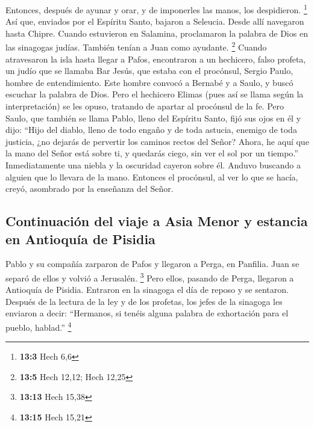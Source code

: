 \begin{paracol}{2}
 Entonces, después de ayunar y orar, y de imponerles las
manos, los despidieron. \footnote{\textbf{13:3} Hech 6,6} 
Así que, enviados por el Espíritu Santo, bajaron a Seleucia. Desde allí
navegaron hasta Chipre.  Cuando estuvieron en Salamina,
proclamaron la palabra de Dios en las sinagogas judías. También tenían a
Juan como ayudante. \footnote{\textbf{13:5} Hech 12,12; Hech 12,25}
 Cuando atravesaron la isla hasta llegar a Pafos,
encontraron a un hechicero, falso profeta, un judío que se llamaba Bar
Jesús,  que estaba con el procónsul, Sergio Paulo, hombre
de entendimiento. Este hombre convocó a Bernabé y a Saulo, y buscó
escuchar la palabra de Dios.  Pero el hechicero Elimas
(pues así se llama según la interpretación) se les opuso, tratando de
apartar al procónsul de la fe.  Pero Saulo, que también se
llama Pablo, lleno del Espíritu Santo, fijó sus ojos en él
 y dijo: ``Hijo del diablo, lleno de todo engaño y de
toda astucia, enemigo de toda justicia, ¿no dejarás de pervertir los
caminos rectos del Señor?  Ahora, he aquí que la mano del
Señor está sobre ti, y quedarás ciego, sin ver el sol por un tiempo.''
Inmediatamente una niebla y la oscuridad cayeron sobre él. Anduvo
buscando a alguien que lo llevara de la mano.  Entonces
el procónsul, al ver lo que se hacía, creyó, asombrado por la enseñanza
del Señor.

\hypertarget{continuaciuxf3n-del-viaje-a-asia-menor-y-estancia-en-antioquuxeda-de-pisidia}{%
\subsection{Continuación del viaje a Asia Menor y estancia en Antioquía
de
Pisidia}\label{continuaciuxf3n-del-viaje-a-asia-menor-y-estancia-en-antioquuxeda-de-pisidia}}

 Pablo y su compañía zarparon de Pafos y llegaron a
Perga, en Panfilia. Juan se separó de ellos y volvió a Jerusalén.
\footnote{\textbf{13:13} Hech 15,38}  Pero ellos, pasando
de Perga, llegaron a Antioquía de Pisidia. Entraron en la sinagoga el
día de reposo y se sentaron.  Después de la lectura de la
ley y de los profetas, los jefes de la sinagoga les enviaron a decir:
``Hermanos, si tenéis alguna palabra de exhortación para el pueblo,
hablad.'' \footnote{\textbf{13:15} Hech 15,21}


\end{paracol}
